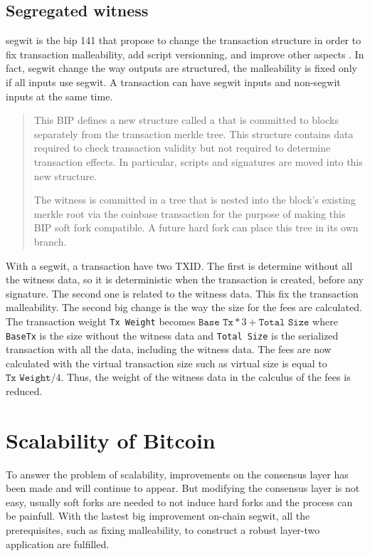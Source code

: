 \subsection{Segregated witness}

\gls{segwit} is the \gls{bip} 141 that propose to change the transaction structure
in order to fix transaction malleability, add script versionning, and improve other
aspects \cite{SegWit, SegWitBIP}. In fact, \gls{segwit} change the way outputs are
structured, the malleability is fixed only if all inputs use \gls{segwit}. A
transaction can have \gls{segwit} inputs and non-\gls{segwit} inputs at the same
time.

\begin{quote}
  This BIP defines a new structure called a  that is committed to
  blocks separately from the transaction merkle tree. This structure contains
  data required to check transaction validity but not required to determine
  transaction effects. In particular, scripts and signatures are moved into this
  new structure.

  The witness is committed in a tree that is nested into the block's existing
  merkle root via the coinbase transaction for the purpose of making this BIP
  soft fork compatible. A future hard fork can place this tree in its own branch.
\end{quote}

With a \gls{segwit}, a transaction have two TXID. The first is determine without
all the witness data, so it is deterministic when the transaction is created,
before any signature. The second one is related to the witness data. This fix
the transaction malleability. The second big change is the way the size for the
fees are calculated. The transaction weight \texttt{Tx Weight} becomes
$\texttt{Base Tx} * 3 + \texttt{Total Size}$ where \texttt{BaseTx} is the size
without the witness data and \texttt{Total Size} is the serialized transaction
with all the data, including the witness data.
The fees are now calculated with the virtual transaction size such as virtual
size is equal to $\texttt{Tx Weight} / 4$. Thus, the weight of the witness data
in the calculus of the fees is reduced.

\section{Scalability of Bitcoin}

To answer the problem of scalability, improvements on the consensus layer has been
made and will continue to appear. But modifying the consensus layer is not easy,
usually soft forks are needed to not induce hard forks and the process can be
painfull. With the lastest big improvement on-chain \gls{segwit}, all the prerequisites,
such as fixing malleability, to construct a robust layer-two application are fulfilled.

